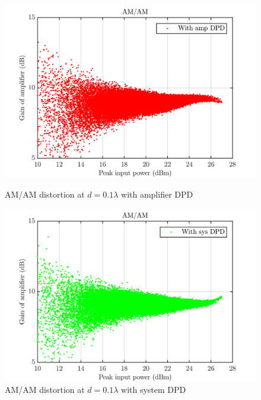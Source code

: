 \begin{figure}[H]
  \centering
  \begin{minipage}[b]{0.5\textwidth}
	\includegraphics[scale = 0.5]{figures/measurement/cree/meas3/amam_amp_dpd_0p1.png}
	\caption{AM/AM distortion at $d = 0.1\lambda$ with amplifier DPD}	
    \label{fig:meas4_amam1}
  \end{minipage}
  \hfill
  \begin{minipage}[b]{0.4\textwidth}
	\includegraphics[scale = 0.5]{figures/measurement/cree/meas3/amam_sys_dpd_0p1.png}
	\caption{AM/AM distortion at $d = 0.1\lambda$ with system DPD}
    \label{fig:meas4_amam2}
  \end{minipage}
\end{figure}

